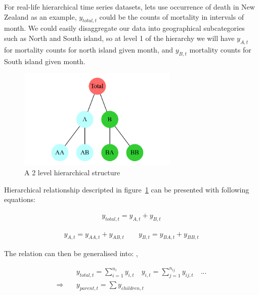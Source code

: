 \newpara

For real-life hierarchical time series datasets, lets use occurrence of death in New Zealand as an example, $y_{total,t}$ could be the counts of mortality in intervals of month. We could easily disaggregate our data into geographical subcategories such as North and South island, so at level 1 of the hierarchy we will have $y_{A,t}$ for mortality counts for north island given month, and $y_{B,t}$ mortality counts for South island  given month. 

\begin{figure}[!t]
	\centering
	\includegraphics[width=3in]{Figures/treesimple}
	\caption{A 2 level hierarchical structure}
	\label{fig:treesimple}
\end{figure}

\newpara

Hierarchical relationship descripted in figure~\ref{fig:treesimple} can be presented with following equations:

\begin{equation}\label{equ:ts1}
\begin{aligned}
y_{total,t} = y_{A,t}+y_{B,t}
\end{aligned}
\end{equation}

\begin{equation}\label{equ:ts2}
\begin{aligned}
y_{A,t}=y_{AA,t}+y_{AB,t}\quad \quad y_{B,t}=y_{BA,t}+y_{BB,t}
\end{aligned}
\end{equation}

The relation can then be generalised into: , 

\begin{equation}\label{equ:Ts3}
\begin{aligned}
& y_{total,t} = \sum_{i=1}^{n_{i}} y_{i,t} \quad y_{i,t} = \sum_{j=1}^{n_{ij}} y_{ij,t} \quad... \\
\Rightarrow \quad & y_{parent,t} = \sum y_{children,t}
\end{aligned}
\end{equation}

